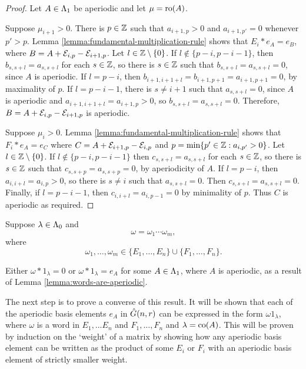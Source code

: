 \documentclass[a4paper, 11pt]{report}
\begin{document}
\begin{proof}
Let $A\in\Lambda_1{}$ be aperiodic and let $\mu=\operatorname{ro}(A)$.

Suppose $\mu_{i+1}>0$. There is $p\in\mathbb{Z}$ such that $a_{i+1,p}>0$ and $a_{i+1,p'}=0$ whenever $p'>p$. Lemma \ref{lemma:fundamental-multiplication-rule} shows that $E_i\ast e_A = e_B$, where $B=A+\mathcal{E}_{i,p}-\mathcal{E}_{i+1,p}$. Let $l\in\mathbb{Z}\setminus\{0\}$. If $l\notin\{p-i,p-i-1\}$, then $b_{s,s+l}=a_{s,s+l}$ for each $s\in\mathbb{Z}$, so there is $s\in\mathbb{Z}$ such that $b_{s,s+l}=a_{s,s+l}=0$, since $A$ is aperiodic. If $l=p-i$, then $b_{i+1,i+1+l} = b_{i+1,p+1}=a_{i+1,p+1}=0$, by maximality of $p$. If $l=p-i-1$, there is $s\neq i+1$ such that $a_{s,s+l}=0$, since $A$ is aperiodic and $a_{i+1,i+1+l}=a_{i+1,p}>0$, so $b_{s,s+l}=a_{s,s+l}=0$. Therefore, $B=A+\mathcal{E}_{i,p}-\mathcal{E}_{i+1,p}$ is aperiodic.

Suppose $\mu_i>0$. Lemma \ref{lemma:fundamental-multiplication-rule} shows that $F_i\ast e_A = e_C$ where $C=A+\mathcal{E}_{i+1,p}-\mathcal{E}_{i,p}$ and $p=\min\{p'\in\mathbb{Z}: a_{i,p'}>0\}$. Let $l\in\mathbb{Z}\setminus\{0\}$. If $l\notin\{p-i,p-i-1\}$ then $c_{s,s+l}=a_{s,s+l}$ for each $s\in\mathbb{Z}$, so there is $s\in\mathbb{Z}$ such that $c_{s,s+p}=a_{s,s+p}=0$, by aperiodicity of $A$. If $l=p-i$, then $a_{i,i+l}=a_{i,p}>0$, so there is $s\neq i$ such that $a_{s,s+l}=0$. Then $c_{s,s+l}=a_{s,s+l}=0$. Finally, if $l=p-i-1$, then $c_{i,i+l}=a_{i,p-1}=0$ by minimality of $p$. Thus $C$ is aperiodic as required.
\end{proof}

Suppose $\lambda\in\Lambda_0{}$ and
\begin{equation*}
\omega = \omega_1\cdots\omega_m,
\end{equation*}
where
\begin{equation*}
\omega_1,\ldots,\omega_m\in\{E_1,\ldots,E_n\}\cup\{F_1,\ldots,F_n\}.
\end{equation*}

Either $\omega\ast 1_\lambda=0$ or $\omega\ast 1_\lambda = e_A$ for some $A\in\Lambda_1{}$, where $A$ is aperiodic, as a result of Lemma \ref{lemma:words-are-aperiodic}.

The next step is to prove a converse of this result. It will be shown that each of the aperiodic basis elements $e_A$ in $\hat{G}(n,r)$ can be expressed in the form $\omega 1_\lambda$, where $\omega$ is a word in $E_1,\ldots E_n$ and $F_1,\ldots, F_n$ and $\lambda=\operatorname{co}(A)$. This will be proven by induction on the `weight' of a matrix by showing how any aperiodic basis element can be written as the product of some $E_i$ or $F_i$ with an aperiodic basis element of strictly smaller weight.
\end{document}
